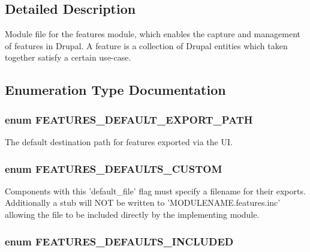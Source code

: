 \subsection{Detailed Description}
Module file for the features module, which enables the capture and management of features in Drupal. A feature is a collection of Drupal entities which taken together satisfy a certain use-\/case. 

\subsection{Enumeration Type Documentation}
\hypertarget{features_8module_a29a3735e1ba70ad921c88f6d03dabe0f}{
\subsubsection[{FEATURES\_\-DEFAULT\_\-EXPORT\_\-PATH}]{\setlength{\rightskip}{0pt plus 5cm}enum {\bf FEATURES\_\-DEFAULT\_\-EXPORT\_\-PATH}}}
\label{features_8module_a29a3735e1ba70ad921c88f6d03dabe0f}
The default destination path for features exported via the UI. \hypertarget{features_8module_a1e60ef188014233e6c2f2f47d49b0207}{
\subsubsection[{FEATURES\_\-DEFAULTS\_\-CUSTOM}]{\setlength{\rightskip}{0pt plus 5cm}enum {\bf FEATURES\_\-DEFAULTS\_\-CUSTOM}}}
\label{features_8module_a1e60ef188014233e6c2f2f47d49b0207}
Components with this 'default\_\-file' flag must specify a filename for their exports. Additionally a stub will NOT be written to 'MODULENAME.features.inc' allowing the file to be included directly by the implementing module. \hypertarget{features_8module_a92c2163fbee04cf83502aa6b7f1c259d}{
\subsubsection[{FEATURES\_\-DEFAULTS\_\-INCLUDED}]{\setlength{\rightskip}{0pt plus 5cm}enum {\bf FEATURES\_\-DEFAULTS\_\-INCLUDED}}}
